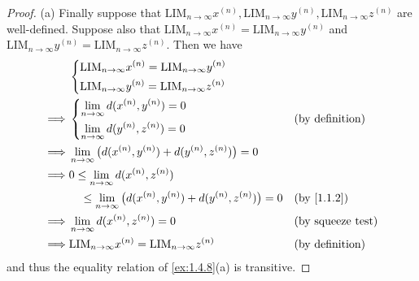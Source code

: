 \begin{proof}{(a)}
  Finally suppose that \(\text{LIM}_{n \to \infty} x^{(n)}, \text{LIM}_{n \to \infty} y^{(n)}, \text{LIM}_{n \to \infty} z^{(n)}\) are well-defined.
  Suppose also that \(\text{LIM}_{n \to \infty} x^{(n)} = \text{LIM}_{n \to \infty} y^{(n)}\) and \(\text{LIM}_{n \to \infty} y^{(n)} = \text{LIM}_{n \to \infty} z^{(n)}\).
  Then we have
  \begin{align*}
             & \begin{dcases}
                 \text{LIM}_{n \to \infty} x^{(n)} = \text{LIM}_{n \to \infty} y^{(n)} \\
                 \text{LIM}_{n \to \infty} y^{(n)} = \text{LIM}_{n \to \infty} z^{(n)}
               \end{dcases}                                                \\
    \implies & \begin{dcases}
                 \lim_{n \to \infty} d(x^{(n)}, y^{(n)}) = 0 \\
                 \lim_{n \to \infty} d(y^{(n)}, z^{(n)}) = 0
               \end{dcases}                                         &  & \text{(by definition)}                                     \\
    \implies & \lim_{n \to \infty} \big(d(x^{(n)}, y^{(n)}) + d(y^{(n)}, z^{(n)})\big) = 0                                          \\
    \implies & 0 \leq \lim_{n \to \infty} d(x^{(n)}, z^{(n)})                                                                       \\
             & \quad \leq \lim_{n \to \infty} \big(d(x^{(n)}, y^{(n)}) + d(y^{(n)}, z^{(n)})\big) = 0 &  & \by{1.1.2}               \\
    \implies & \lim_{n \to \infty} d(x^{(n)}, z^{(n)}) = 0                                            &  & \text{(by squeeze test)} \\
    \implies & \text{LIM}_{n \to \infty} x^{(n)} = \text{LIM}_{n \to \infty} z^{(n)}                  &  & \text{(by definition)}
  \end{align*}
  and thus the equality relation of \cref{ex:1.4.8}(a) is transitive.
\end{proof}

